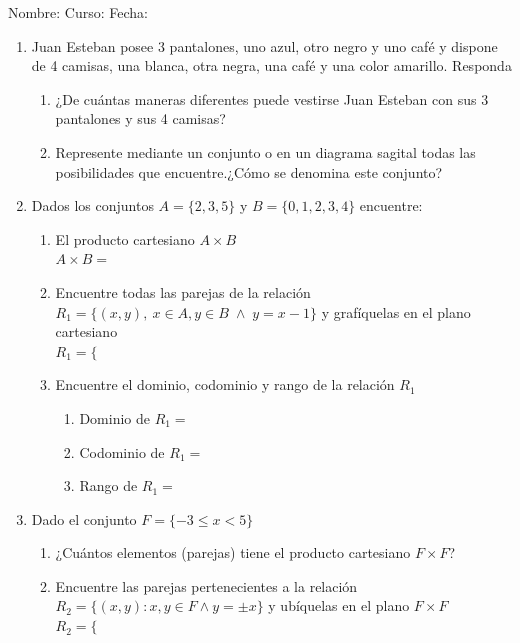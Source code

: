 \documentclass[letterpaper,fleqn]{article}
\newcommand{\LineaNombre}{%
\par
\vspace{\baselineskip}
Nombre:\hrulefill \; Curso: \underline{\hspace*{48pt}} \; Fecha: \underline{\hspace*{2.5cm}} \relax
\par}
\begin{document}
\LineaNombre
\begin{enumerate}
 \item Juan Esteban posee 3 pantalones, uno azul, otro negro y uno café y dispone de 4 camisas, una blanca, otra negra, una café y una color amarillo. Responda
 \begin{enumerate}
 \item ¿De cuántas maneras diferentes puede vestirse Juan Esteban con sus 3 pantalones y sus 4 camisas? \underline{\hspace{1in}}
 \item Represente mediante un conjunto o en un diagrama sagital todas las posibilidades que encuentre.¿Cómo se denomina este conjunto? \noanswer
\end{enumerate}
\item Dados los conjuntos $A=\{2,3,5\}$ y $B=\{0,1,2,3,4\}$ encuentre:
\begin{enumerate}
\item El producto cartesiano $A\times B$\\
$A \times B=$ \noanswer[.5in]
\item Encuentre todas las parejas de la relación $R_{1}=\{(x,y), \: x \in A, y \in B \; \wedge \; y=x-1\}$ y grafíquelas en el plano cartesiano\\

$R_{1}=\{$ \noanswer[.5in]
\newpage
\begin{center}

\end{center}
\item Encuentre el dominio, codominio y rango de la relación $R_{1}$
\begin{enumerate}
\item Dominio de $R_{1}=$
\item Codominio de $R_{1}=$
\item Rango de $R_{1}=$
\end{enumerate}
\end{enumerate}
\item Dado el conjunto $F=\{-3\leq x<5\}$
\begin{enumerate}
\item ¿Cuántos elementos (parejas) tiene el producto cartesiano $F\times F$? \underline{\hspace*{1in}}
\item Encuentre las parejas pertenecientes a la relación $R_{2}=\{(x,y): x,y \in F \wedge y=\pm x\}$ y ubíquelas en el plano $F\times F$\\
$R_{2}=\{$
\begin{center}

\end{center}
\end{enumerate}
 \end{enumerate}
\end{document}
